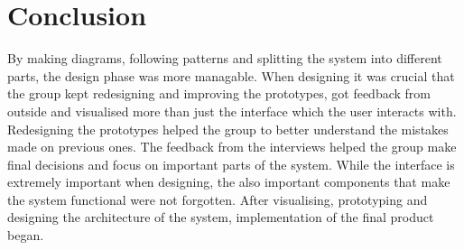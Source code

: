 \chapter{Conclusion}

By making diagrams, following patterns and splitting the system into different parts, the design phase was more managable.
When designing it was crucial that the group kept redesigning and improving the prototypes, got feedback from outside and visualised more than just the interface which the user interacts with.
Redesigning the prototypes helped the group to better understand the mistakes made on previous ones.
The feedback from the interviews helped the group make final decisions and focus on important parts of the system.
While the interface is extremely important when designing, the also important components that make the system functional were not forgotten.
After visualising, prototyping and designing the architecture of the system, implementation of the final product began.